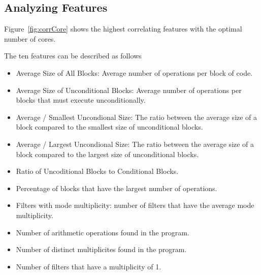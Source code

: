 \subsection{Analyzing Features}

Figure~\ref{fig:corrCore} shows the highest correlating features with the optimal number of cores.

The ten features can be described as follows
\begin{itemize}
\item Average Size of All Blocks: Average number of operations per block of code.
\vspace{-1em}
\item Average Size of Unconditional Blocks: Average number of operations per blocks that must execute unconditionally.
\vspace{-1em}
\item Average / Smallest Uncondional Size: The ratio between the average size of a block compared to the smallest size of unconditional blocks.
\vspace{-1em}
\item Average / Largest Uncondional Size: The ratio between the average size of a block compared to the largest size of unconditional blocks.
\vspace{-1em}
\item Ratio of Uncoditional Blocks to Conditional Blocks.
\vspace{-1em}
\item Percentage of blocks that have the largest number of operations.
\vspace{-1em}
\item Filters with mode multiplicity: number of filters that have the average mode multiplicity.
\vspace{-1em}
\item Number of arithmetic operations found in the program.
\vspace{-1em}
\item Number of distinct multiplicites found in the program.
\vspace{-1em}
\item Number of filters that have a multiplicity of 1.
\end{itemize}


